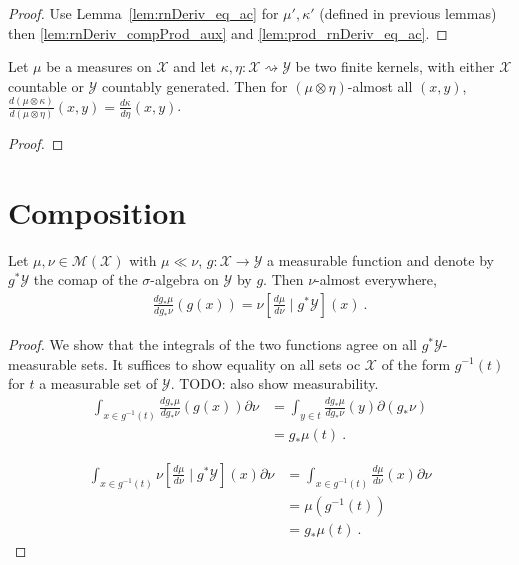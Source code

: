 \begin{proof} \leanok
{}
Use Lemma~\ref{lem:rnDeriv_eq_ac} for $\mu', \kappa'$ (defined in previous lemmas) then \ref{lem:rnDeriv_compProd_aux} and \ref{lem:prod_rnDeriv_eq_ac}.
\end{proof}


\begin{corollary}
  \label{cor:rnDeriv_compProd_right}
  \leanok
  Let $\mu$ be a measures on $\mathcal X$ and let $\kappa, \eta : \mathcal X \rightsquigarrow \mathcal Y$ be two finite kernels, with either $\mathcal X$ countable or $\mathcal{Y}$ countably generated.
  Then for $(\mu \otimes \eta)$-almost all $(x, y)$, $\frac{d (\mu \otimes \kappa)}{d (\mu \otimes \eta)}(x,y) = \frac{d \kappa}{d \eta}(x,y)$.
\end{corollary}

\begin{proof} \leanok
{}
\end{proof}



\section{Composition}


\begin{lemma}
  \label{lem:rnDeriv_map_eq_condexp}
  \leanok
  \uses{}
  Let $\mu, \nu \in \mathcal M(\mathcal X)$ with $\mu \ll \nu$, $g : \mathcal X \to \mathcal Y$ a measurable function and denote by $g^* \mathcal Y$ the comap of the $\sigma$-algebra on $\mathcal Y$ by $g$.
  Then $\nu$-almost everywhere,
  \begin{align*}
  \frac{d g_*\mu}{d g_*\nu}(g(x)) = \nu\left[ \frac{d \mu}{d \nu} \mid g^* \mathcal Y\right](x)
  \: .
  \end{align*}
\end{lemma}

\begin{proof}\leanok
\uses{}
We show that the integrals of the two functions agree on all $g^* \mathcal Y$-measurable sets. It suffices to show equality on all sets oc $\mathcal X$ of the form $g^{-1}(t)$ for $t$ a measurable set of $\mathcal Y$.
TODO: also show measurability.
\begin{align*}
\int_{x \in g^{-1}(t)}\frac{d g_*\mu}{d g_*\nu}(g(x)) \partial\nu
&= \int_{y \in t}\frac{d g_*\mu}{d g_*\nu}(y) \partial(g_*\nu)
\\
&= g_*\mu (t)
\: .
\end{align*}

\begin{align*}
\int_{x \in g^{-1}(t)}\nu\left[ \frac{d \mu}{d \nu} \mid g^* \mathcal Y\right](x) \partial\nu
&= \int_{x \in g^{-1}(t)}\frac{d \mu}{d \nu}(x) \partial\nu
\\
&= \mu(g^{-1}(t))
\\
&= g_*\mu(t)
\: .
\end{align*}


\end{proof}


